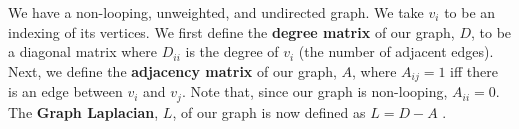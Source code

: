 We have a non-looping, unweighted, and undirected graph. We take $v_i$ to be an indexing of its vertices.
We first define the \textbf{degree matrix} of our graph, $D$, to be a diagonal matrix where $D_{ii}$ is the degree of $v_i$ (the number of adjacent edges).
Next, we define the \textbf{adjacency matrix} of our graph, $A$, where $A_{ij}=1$ iff there is an edge between $v_i$ and $v_j$. Note that, since our graph is non-looping, $A_{ii}=0$.
The \textbf{Graph Laplacian}, $L$, of our graph is now defined as $L=D-A$ \cite{weisstein}.
